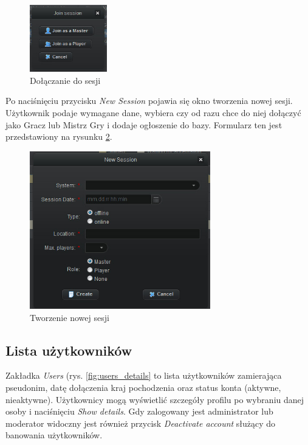 \begin{figure}[htb]	
\centering
\includegraphics[width=0.3\textwidth]{./img/interfejsy/join_session}
\caption{Dołączanie do sesji}
\label{fig:join_session}
\end{figure}

Po naciśnięciu przycisku \emph{New Session} pojawia się okno tworzenia nowej sesji. Użytkownik podaje wymagane dane, wybiera czy od razu chce do niej dołączyć jako Gracz lub Mistrz Gry i dodaje ogłoszenie do bazy. Formularz ten jest przedstawiony na rysunku \ref{fig:create_session}.

\begin{figure}[htb]	
\centering
\includegraphics[width=0.7\textwidth]{./img/interfejsy/create_session}
\caption{Tworzenie nowej sesji}
\label{fig:create_session}
\end{figure}




\subsection{Lista użytkowników}
\label{sec:users_detail}
Zakładka \emph{Users} (rys. \ref{fig:users_details} to lista użytkowników zamierająca pseudonim, datę dołączenia kraj pochodzenia oraz status konta (aktywne, nieaktywne). Użytkownicy mogą wyświetlić szczegóły profilu po wybraniu danej osoby i naciśnięciu \emph{Show details}. Gdy zalogowany jest administrator lub moderator widoczny jest również przycisk \emph{Deactivate account} służący do banowania użytkowników. 

